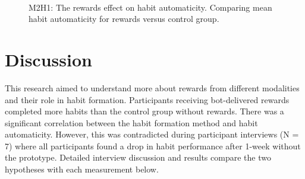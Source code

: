 
\begin{figure}[H]
  \centering
  \caption{M2H1: The rewards effect on habit automaticity. Comparing mean habit automaticity for rewards versus control group.}~\label{fig:m2_h1}
\end{figure}


\section{Discussion}
This research aimed to understand more about rewards from different modalities and their role in habit formation. Participants receiving bot-delivered rewards completed more habits than the control group without rewards. There was a significant correlation between the habit formation method and habit automaticity. However, this was contradicted during participant interviews (N = 7) where all participants found a drop in habit performance after 1-week without the prototype. Detailed interview discussion and results compare the two hypotheses with each measurement below.





